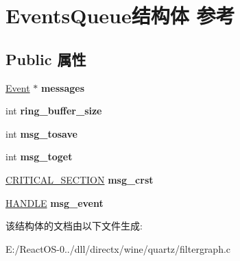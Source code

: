 \hypertarget{struct_events_queue}{}\section{Events\+Queue结构体 参考}
\label{struct_events_queue}
\subsection*{Public 属性}
\begin{DoxyCompactItemize}
\item 
\mbox{\label{struct_events_queue_a5f89587e51bc18785bcac179a9885534}} 
\hyperlink{struct_event}{Event} $\ast$ {\bfseries messages}
\item 
\mbox{\label{struct_events_queue_ae3ccbcfc4f3ba9f596a027477302c589}} 
int {\bfseries ring\+\_\+buffer\+\_\+size}
\item 
\mbox{\label{struct_events_queue_ae0d626753355b7f927ab0f30f7e7d344}} 
int {\bfseries msg\+\_\+tosave}
\item 
\mbox{\label{struct_events_queue_aefa6d2bfa4f9abda26f56b5f6947ea3f}} 
int {\bfseries msg\+\_\+toget}
\item 
\mbox{\label{struct_events_queue_a529f5669a3b30fdf7caf8c629f73d640}} 
\hyperlink{struct___c_r_i_t_i_c_a_l___s_e_c_t_i_o_n}{C\+R\+I\+T\+I\+C\+A\+L\+\_\+\+S\+E\+C\+T\+I\+ON} {\bfseries msg\+\_\+crst}
\item 
\mbox{\label{struct_events_queue_a881a0cc7c302fa66e9b762ecd7e4393e}} 
\hyperlink{interfacevoid}{H\+A\+N\+D\+LE} {\bfseries msg\+\_\+event}
\end{DoxyCompactItemize}


该结构体的文档由以下文件生成\+:\begin{DoxyCompactItemize}
\item 
E\+:/\+React\+O\+S-\/0../dll/directx/wine/quartz/filtergraph.\+c\end{DoxyCompactItemize}
